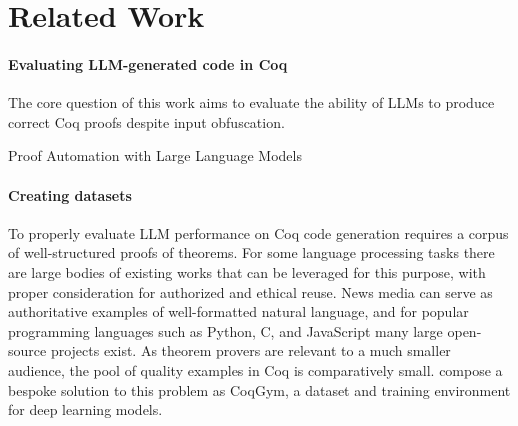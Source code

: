 
\section{Related Work}
\label{sec:related-work}

\paragraph{Evaluating LLM-generated code in Coq}

The core question of this work aims to evaluate
the ability of LLMs to produce correct Coq proofs
despite input obfuscation.

Proof Automation with Large Language Models\cite{proofautomationwithllms}



\paragraph
{Creating datasets}
To properly evaluate LLM performance on
Coq code generation requires a corpus of well-structured
proofs of theorems. For some language processing tasks
there are large bodies of existing works that can be leveraged for this purpose, 
with proper consideration for authorized and ethical reuse.
News media can serve as authoritative examples of
well-formatted natural language, and for popular programming
languages such as Python, C, and JavaScript many large
open-source projects exist.
As theorem provers are relevant to a much smaller audience, the pool of quality examples in Coq is
comparatively small.
\citet{learningtoprove} compose a bespoke solution
to this problem as CoqGym, a dataset and training
environment for deep learning models.




